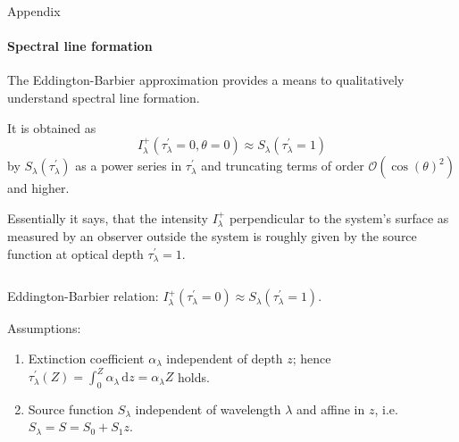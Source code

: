 \documentclass{beamer}
\begin{document}
\begin{frame}[allowframebreaks]{Appendix}
	\framesubtitle{Spectral line formation}
	The Eddington-Barbier approximation provides a means to qualitatively understand spectral line formation.
	
	It is obtained as \begin{equation}
		I_\lambda^+(\tau_\lambda^\prime=0, \theta=0) \approx S_\lambda(\tau_\lambda^\prime = 1)
	\end{equation} by $S_\lambda(\tau_\lambda^\prime)$ as a power series in $\tau_\lambda^\prime$ and truncating terms of order $\mathcal{O}(\cos(\theta)^2)$ and higher.
	
	Essentially it says, that the intensity $I_\lambda^+$ perpendicular to the system's surface as measured by an observer outside the system is roughly given by the source function at optical depth $\tau_\lambda^\prime = 1$.
	
	\newpage
	\begin{columns}
		\begin{column}{0.45\textwidth}
			Eddington-Barbier relation: $I_\lambda^+(\tau_\lambda^\prime=0) \approx S_\lambda(\tau_\lambda^\prime=1)$.
			
			Assumptions:
			\begin{enumerate}
				\item Extinction coefficient $\alpha_\lambda$ independent of depth $z$; hence $\tau_\lambda^\prime(Z) = \int_{0}^Z\alpha_\lambda\,\mathrm{d}z = \alpha_\lambda Z$ holds.
				\item Source function $S_\lambda$ independent of wavelength $\lambda$ and affine in $z$, i.e. $S_\lambda = S = S_0 + S_1z$.
			\end{enumerate}
		\end{column}
		

\end{columns}
\end{frame}
\end{document}
